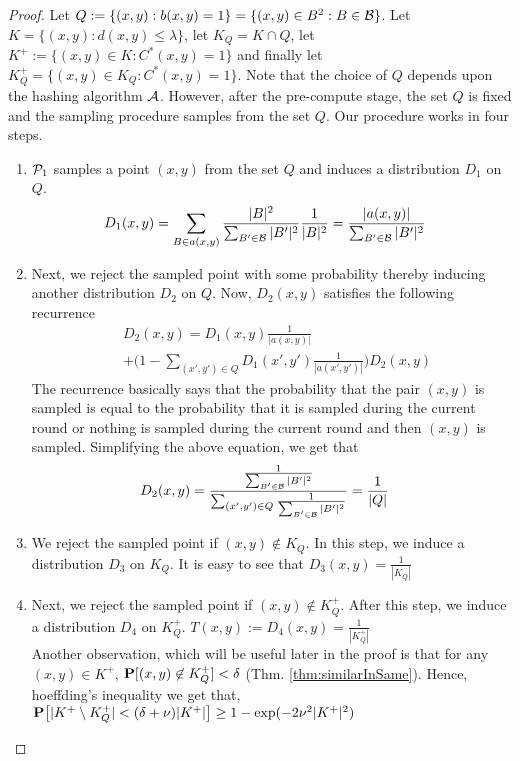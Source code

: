 \posDistributionLSH*
\begin{proof}
Let $Q := \{(x, y): b(x, y) = 1\} = \{(x, y) \in B^2: B \in \mathcal B\}$. Let $K = \{(x, y): d(x, y) \le \lambda\}$, let $K_Q = K\cap Q$, let $K^+ := \{(x, y) \in K: C^*(x, y) = 1\}$ and finally let $K_Q^+ = \{(x, y) \in K_Q : C^*(x, y) = 1\}$. Note that the choice of $Q$ depends upon the hashing algorithm $\mathcal A$. However, after the pre-compute stage, the set $Q$ is fixed and the sampling procedure samples from the set $Q$. Our procedure works in four steps. 
\begin{enumerate}[noitemsep,label=\textbf{S.\arabic*}]
  \item $\mathcal P_1$ samples a point $(x, y)$ from the set $Q$ and induces a distribution $D_1$ on $Q$. 
  \begin{align*}
    &D_1(x, y) = \sum_{B \in a(x, y)} \frac{|B|^2}{\sum_{B' \in \mathcal B}|B'|^2}\frac{1}{|B|^2} = \frac{|a(x, y)|}{\sum_{B' \in \mathcal B}|B'|^2}
  \end{align*}
  \item Next, we reject the sampled point with some probability thereby inducing another distribution $D_2$ on $Q$. Now, $D_2(x, y)$ satisfies the following recurrence
  \begin{align*}
    &D_2(x, y) = D_1(x, y) \frac{1}{|a(x, y)|} \\
    &+ \Big(1-\sum_{(x', y') \in Q} D_1(x', y') \frac{1}{|a(x', y')|}\Big)D_2(x, y)
  \end{align*}
  The recurrence basically says that the probability that the pair $(x, y)$ is sampled is equal to the probability that it is sampled during the current round or nothing is sampled during the current round and then $(x, y)$ is sampled. Simplifying the above equation, we get that
   \begin{align*}
    &D_2(x, y) = \frac{\frac{1}{\sum_{B' \in \mathcal B}|B'|^2}}{\sum_{(x', y') \in Q}\frac{1}{\sum_{B' \in \mathcal B}|B'|^2}} = \frac{1}{|Q|}
  \end{align*}
  \item We reject the sampled point if $(x, y) \not\in K_Q$. In this step, we induce a distribution $D_3$ on $K_Q$. It is easy to see that $D_3(x, y) = \frac{1}{|K_Q|}$
  \item \label{item:D4} Next, we reject the sampled point if $(x, y) \not\in K_Q^+$. After this step, we induce a distribution $D_4$ on $K^+_Q$. $T(x, y) := D_4(x, y) = \frac{1}{|K_Q^+|}$\\
  Another observation, which will be useful later in the proof is that for any $(x, y) \in K^+$, $\mathbf P[(x, y) \not\in K_Q^+] < \delta$ (Thm. \ref{thm:similarInSame}). Hence, hoeffding's inequality we get that, $\mathbf P\big[|K^+\setminus K_Q^+| < (\delta+\nu)|K^+|\big] \ge 1- \exp(-2\nu^2 |K^+|^2)$ 

\end{enumerate}
\end{proof}
